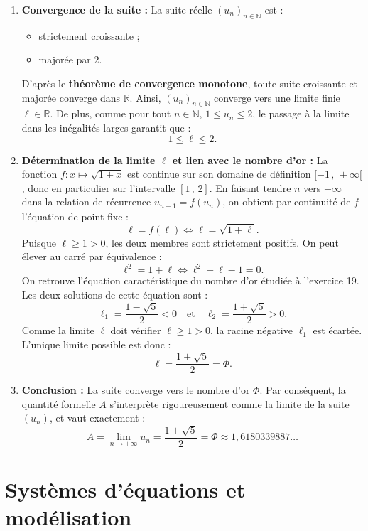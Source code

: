 \documentclass[11pt,a4paper]{article}
\newcommand{\N}{\mathbb{N}}
\newcommand{\R}{\mathbb{R}}
\begin{document}
\begin{correctionbox}
\begin{enumerate}
    \item \textbf{Convergence de la suite :}
    La suite réelle $(u_n)_{n \in \N}$ est :
    \begin{itemize}
        \item strictement croissante ;
        \item majorée par $2$.
    \end{itemize}
    D'après le \textbf{théorème de convergence monotone}, toute suite croissante et majorée converge dans $\R$.
    Ainsi, $(u_n)_{n \in \N}$ converge vers une limite finie $\ell \in \R$.
    De plus, comme pour tout $n \in \N$, $1 \le u_n \le 2$, le passage à la limite dans les inégalités larges garantit que :
    \[
    1 \le \ell \le 2.
    \]

    \item \textbf{Détermination de la limite $\ell$ et lien avec le nombre d'or :}
    La fonction $f : x \mapsto \sqrt{1 + x}$ est continue sur son domaine de définition $[-1\,,\, +\infty[$, donc en particulier sur l'intervalle $[1\,,\, 2]$.
    En faisant tendre $n$ vers $+\infty$ dans la relation de récurrence $u_{n+1} = f(u_n)$, on obtient par continuité de $f$ l'équation de point fixe :
    \[
    \ell = f(\ell) \iff \ell = \sqrt{1 + \ell}.
    \]
    Puisque $\ell \ge 1 > 0$, les deux membres sont strictement positifs. On peut élever au carré par équivalence :
    \[
    \ell^2 = 1 + \ell \iff \ell^2 - \ell - 1 = 0.
    \]
    On retrouve l'équation caractéristique du nombre d'or étudiée à l'exercice 19.
    Les deux solutions de cette équation sont :
    \[
    \ell_1 = \frac{1 - \sqrt{5}}{2} < 0 \quad \text{et} \quad \ell_2 = \frac{1 + \sqrt{5}}{2} > 0.
    \]
    Comme la limite $\ell$ doit vérifier $\ell \ge 1 > 0$, la racine négative $\ell_1$ est écartée.
    L'unique limite possible est donc :
    \[
    \ell = \frac{1 + \sqrt{5}}{2} = \Phi.
    \]

    \item \textbf{Conclusion :}
    La suite converge vers le nombre d'or $\Phi$. Par conséquent, la quantité formelle $A$ s'interprète rigoureusement comme la limite de la suite $(u_n)$, et vaut exactement :
    \[
    A = \lim_{n \to +\infty} u_n = \frac{1 + \sqrt{5}}{2} = \Phi \approx 1{,}6180339887\dots
    \]
\end{enumerate}
\end{correctionbox}


\section{Systèmes d'équations et modélisation}
\end{document}
